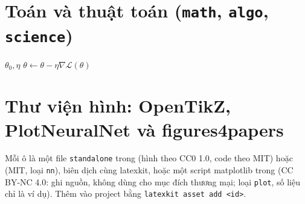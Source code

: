 \documentclass[10pt,a4paper]{article}
\begin{document}
\section{Toán và thuật toán (\texttt{math}, \texttt{algo}, \texttt{science})}

\begin{demo}
\begin{algorithm}[H]
  \caption{Gradient descent}
  \begin{algorithmic}[1]
    \Require $\theta_0, \eta$
      \State $\theta \gets \theta - \eta\nabla\mathcal{L}(\theta)$ 
    \EndWhile
  \end{algorithmic}
\end{algorithm}
\end{demo}

\clearpage
\section{Thư viện hình: OpenTikZ, PlotNeuralNet và figures4papers}\label{sec:catalog}
Mỗi ô là một file \texttt{standalone} trong  (hình theo CC0 1.0,
code theo MIT) hoặc  (MIT, loại \texttt{nn}), biên dịch cùng latexkit,
hoặc một script matplotlib trong  (CC BY-NC 4.0: ghi nguồn, không dùng
cho mục đích thương mại; loại \texttt{plot}, số liệu chỉ là ví dụ).
Thêm vào project bằng \texttt{latexkit asset add <id>}.

\begin{tcbraster}[raster columns=3, raster equal height=rows, raster column skip=6pt, raster row skip=6pt]
\end{tcbraster}
\end{document}
